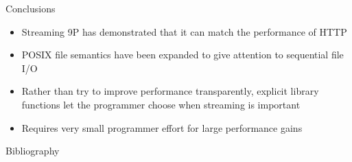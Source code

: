 \documentclass[11pt,compress]{beamer}
\begin{document}
\begin{frame}{Conclusions}
\begin{itemize}
	\item Streaming 9P has demonstrated that it can match the performance of HTTP
	\item POSIX file semantics have been expanded to give attention to sequential file I/O
	\item Rather than try to improve performance transparently, explicit library functions let the programmer choose when streaming is important
	\item Requires very small programmer effort for large performance gains
\end{itemize}
\end{frame}

%
\begin{frame}[allowframebreaks]{Bibliography}

\tiny{
        
}
\end{frame}
\end{document}
